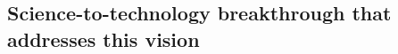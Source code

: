 \documentclass[12pt, a4paper]{article} %
\begin{document}

\subsection{Science-to-technology breakthrough that addresses this vision}
\end{document}
